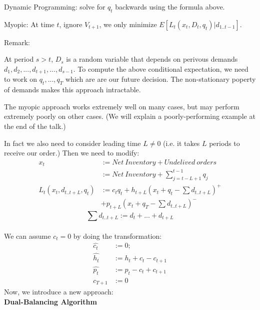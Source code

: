 \documentclass[twoside]{article}
\begin{document}
\begin{multicols}{2}
\begin{compactitem}
      \item 
        Dynamic Programming: solve for $q_t$ backwards using the formula above.
      \item
        Myopic: At time $t$, ignore $V_{t+1}$, we only minimize $E[L_t(x_t,D_t,q_t)|d_{1..t-1}]$.
    \end{compactitem}
    Remark:
    \begin{compactitem}
      \item 
        At period $s>t$, $D_s$ is a random variable that depends on perivous demands $d_1, d_2,...,d_{t+1},...,d_{s-1}$. To compute the above conditional expectation, we need to work on $q_t,...,q_T$ which are are our future decision. The non-stationary poperty of demands makes this approach intractable.
      \item
        The myopic approach works extremely well on many cases\cite{CLAcha1}, but may perform extremely poorly on other cases. (We will explain a poorly-performing example at the end of the talk.)
    \end{compactitem}
    In fact we also need to consider leading time $L \neq 0$ (i.e. it takes $L$ periods to receive our order.) Then we need to modify:
        \begin{align}
          x_t & := Net~Inventory + Undelived~orders\nonumber\\
              & := Net~Inventory + \sum_{j = t - L+1}^{t-1} q_j\nonumber\\
          L_t(x_t,d_{t..t+L},q_t)& :=c_tq_t + h_{t+L}(x_t + q_t - \sum d_{t..t+L})^{+} \nonumber\\
                                &  + p_{t+L}(x_t + q_T - \sum d_{t..t+L})^{-}\nonumber
        \end{align}
        \[ \sum d_{t..t+L} := d_t + ... + d_{t+L}\]\\
    We can assume $c_t = 0$ by doing the transformation:
        \begin{align}
          \hat{c_t} &:= 0;\nonumber\\
          \hat{h_t} &:= h_t + c_t - c_{t+1}\nonumber\\
          \hat{p_t} &:= p_t - c_t + c_{t+1}\nonumber\\
          c_{T+1} &:= 0\nonumber
        \end{align}
    Now, we introduce a new approach:\\
    \textbf{Dual-Balancing Algorithm}\cite{CLAcha2}


\end{multicols}
\end{document}
